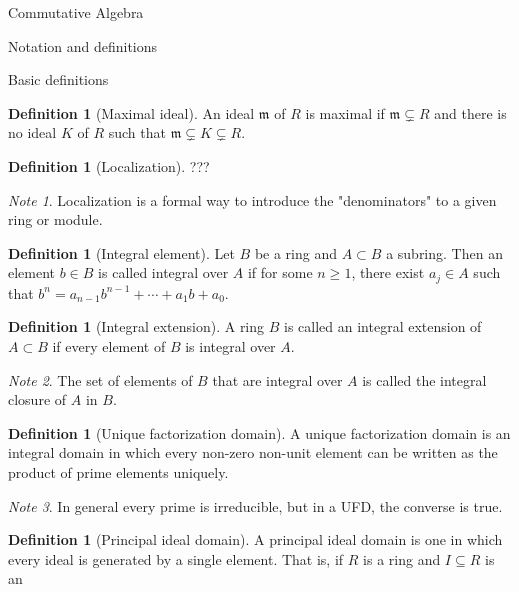 \documentclass{article}
\theoremstyle{definition}
\numberwithin{theorem}{subsection} %
\theoremstyle{remark}
\newtheorem*{remark}{Note}
\theoremstyle{definition}
\newtheorem{definition}[paragraph]{Definition}
\begin{document}
\begin{section}{Commutative Algebra}
  \begin{subsection}{Notation and definitions}
    \begin{subsubsection}{Basic definitions}
      \begin{definition}[Maximal ideal]
        An ideal $\mathfrak m$ of $R$ is maximal if $\mathfrak m \subsetneq R$
        and there is no ideal $K$ of $R$ such that
        $\mathfrak m \subsetneq K \subsetneq R$.
      \end{definition}
      \begin{definition}[Localization]
        ???
      \end{definition}
      \begin{remark}
        Localization is a formal way to introduce the "denominators" to a
        given ring or module.
      \end{remark}
      \begin{definition}[Integral element]
        Let $B$ be a ring and $A \subset B$ a subring. Then an element $b \in B$
        is called integral over $A$ if for some $n \geq 1$, there exist
        $a_j \in A$ such that $b^n = a_{n-1}b^{n-1} + \cdots + a_1b + a_0$.
      \end{definition}
      \begin{definition}[Integral extension]
        A ring $B$ is called an integral extension of $A \subset B$ if every
        element of $B$ is integral over $A$.
      \end{definition}
      \begin{remark}
        The set of elements of $B$ that are integral over $A$ is called the
        integral closure of $A$ in $B$.
      \end{remark}
      \begin{definition}[Unique factorization domain]
        A unique factorization domain is an integral domain in which every
        non-zero non-unit element can be written as the product of prime
        elements uniquely.
      \end{definition}
      \begin{remark}
        In general every prime is irreducible, but in a UFD, the converse is true.
      \end{remark}
      \begin{definition}[Principal ideal domain]
        A principal ideal domain is one in which every ideal is generated by a
        single element. That is, if $R$ is a ring and $I \subseteq R$ is an

\end{definition}
\end{subsubsection}
\end{subsection}
\end{section}
\end{document}
